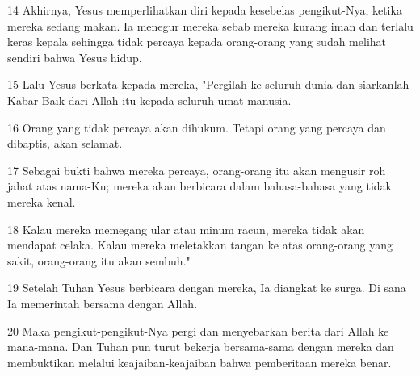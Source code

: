 \par 14 Akhirnya, Yesus memperlihatkan diri kepada kesebelas pengikut-Nya, ketika mereka sedang makan. Ia menegur mereka sebab mereka kurang iman dan terlalu keras kepala sehingga tidak percaya kepada orang-orang yang sudah melihat sendiri bahwa Yesus hidup.
\par 15 Lalu Yesus berkata kepada mereka, "Pergilah ke seluruh dunia dan siarkanlah Kabar Baik dari Allah itu kepada seluruh umat manusia.
\par 16 Orang yang tidak percaya akan dihukum. Tetapi orang yang percaya dan dibaptis, akan selamat.
\par 17 Sebagai bukti bahwa mereka percaya, orang-orang itu akan mengusir roh jahat atas nama-Ku; mereka akan berbicara dalam bahasa-bahasa yang tidak mereka kenal.
\par 18 Kalau mereka memegang ular atau minum racun, mereka tidak akan mendapat celaka. Kalau mereka meletakkan tangan ke atas orang-orang yang sakit, orang-orang itu akan sembuh."
\par 19 Setelah Tuhan Yesus berbicara dengan mereka, Ia diangkat ke surga. Di sana Ia memerintah bersama dengan Allah.
\par 20 Maka pengikut-pengikut-Nya pergi dan menyebarkan berita dari Allah ke mana-mana. Dan Tuhan pun turut bekerja bersama-sama dengan mereka dan membuktikan melalui keajaiban-keajaiban bahwa pemberitaan mereka benar.


